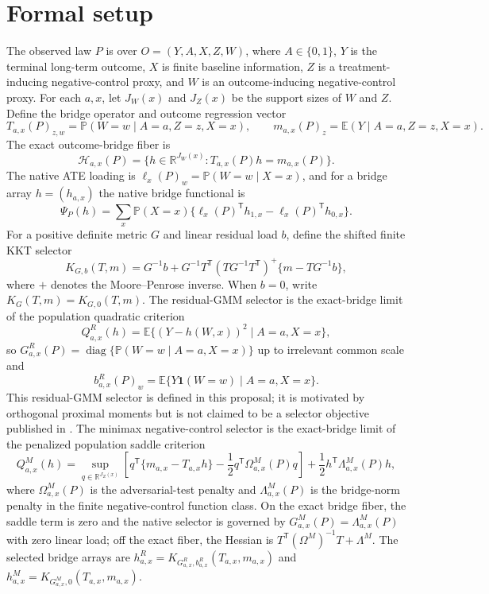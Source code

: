 \documentclass[11pt]{article}
\newcommand{\E}{\mathbb{E}}
\renewcommand{\Pr}{\mathbb{P}}
\newcommand{\one}{\mathbf{1}}
\newcommand{\transpose}{\mathsf{T}}
\newcommand{\calH}{\mathcal{H}}
\newcommand{\R}{\mathbb{R}}
\theoremstyle{definition}
\theoremstyle{plain}
\theoremstyle{remark}
\begin{document}
\section{Formal setup}
The observed law \(P\) is over \(O=(Y,A,X,Z,W)\), where \(A\in\{0,1\}\), \(Y\) is the terminal long-term outcome, \(X\) is finite baseline information, \(Z\) is a treatment-inducing negative-control proxy, and \(W\) is an outcome-inducing negative-control proxy. For each \(a,x\), let \(J_W(x)\) and \(J_Z(x)\) be the support sizes of \(W\) and \(Z\). Define the bridge operator and outcome regression vector
\[
T_{a,x}(P)_{z,w}=\Pr(W=w\mid A=a,Z=z,X=x),\qquad
m_{a,x}(P)_z=\E(Y\mid A=a,Z=z,X=x).
\]
The exact outcome-bridge fiber is
\[
\calH_{a,x}(P)=\{h\in\R^{J_W(x)}:T_{a,x}(P)h=m_{a,x}(P)\}.
\]
The native ATE loading is \(\ell_x(P)_w=\Pr(W=w\mid X=x)\), and for a bridge array \(h=(h_{a,x})\) the native bridge functional is
\[
\Psi_P(h)=\sum_x \Pr(X=x)\{\ell_x(P)^\transpose h_{1,x}-\ell_x(P)^\transpose h_{0,x}\}.
\]
For a positive definite metric \(G\) and linear residual load \(b\), define the shifted finite KKT selector
\[
K_{G,b}(T,m)=G^{-1}b+G^{-1}T^\transpose(TG^{-1}T^\transpose)^+\{m-TG^{-1}b\},
\]
where \(+\) denotes the Moore--Penrose inverse. When \(b=0\), write \(K_G(T,m)=K_{G,0}(T,m)\). The residual-GMM selector is the exact-bridge limit of the population quadratic criterion
\[
Q^R_{a,x}(h)=\E\{(Y-h(W,x))^2\mid A=a,X=x\},
\]
so \(G^R_{a,x}(P)=\operatorname{diag}\{\Pr(W=w\mid A=a,X=x)\}\) up to irrelevant common scale and
\[
b^R_{a,x}(P)_w=\E\{Y\one(W=w)\mid A=a,X=x\}.
\]
This residual-GMM selector is defined in this proposal; it is motivated by orthogonal proximal moments but is not claimed to be a selector objective published in \citet{CuiPuShiMiaoTchetgen2024}. The minimax negative-control selector is the exact-bridge limit of the penalized population saddle criterion
\[
Q^M_{a,x}(h)=\sup_{q\in\R^{J_Z(x)}}\left[q^\transpose\{m_{a,x}-T_{a,x}h\}
-\frac{1}{2}q^\transpose\Omega^M_{a,x}(P)q\right]
+\frac{1}{2}h^\transpose\Lambda^M_{a,x}(P)h,
\]
where \(\Omega^M_{a,x}(P)\) is the adversarial-test penalty and \(\Lambda^M_{a,x}(P)\) is the bridge-norm penalty in the finite negative-control function class. On the exact bridge fiber, the saddle term is zero and the native selector is governed by \(G^M_{a,x}(P)=\Lambda^M_{a,x}(P)\) with zero linear load; off the exact fiber, the Hessian is \(T^\transpose(\Omega^M)^{-1}T+\Lambda^M\). The selected bridge arrays are \(h^R_{a,x}=K_{G^R_{a,x},b^R_{a,x}}(T_{a,x},m_{a,x})\) and \(h^M_{a,x}=K_{G^M_{a,x},0}(T_{a,x},m_{a,x})\).
\end{document}
